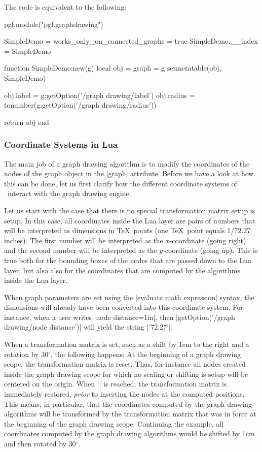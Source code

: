 The code is equivalent to the following:
\begin{codeexample}
pgf.module("pgf.graphdrawing")

SimpleDemo = { works_only_on_connected_graphs = true }
SimpleDemo.__index = SimpleDemo

function SimpleDemo:new(g)
  local obj = { graph = g }
  setmetatable(obj, SimpleDemo)
  
  obj.label  = g:getOption('/graph drawing/label')
  obj.radius = tonumber(g:getOption('/graph drawing/radius'))
  
  return obj  
end  
\end{codeexample}



\subsubsection{Coordinate Systems in Lua}

\label{section-gd-lua-coordinates}

The main job of a graph drawing algorithm is to modify the
coordinates of the nodes of the graph object in the |graph|
attribute. Before we have a look at how this can be done, let us 
first clarify how the different coordinate systems of \pgfname\
interact with the graph drawing engine.

Let us start with the case that there is no special transformation
matrix setup is setup. In this case, all coordinates inside the Lua
layer are pairs of numbers that will be interpreted as dimensions in
\TeX\ points (one \TeX\ point equals 1/72.27 inches). The first number
will be interpreted as the $x$-coordinate (going right) and the second
number will be interpreted as the $y$-coordinate (going up). This is
true both for the bounding boxes of the nodes that are passed down to
the Lua layer, but also also for the coordinates that are computed by
the algorithms inside the Lua layer.

When graph parameters are set using the |evaluate math expression|
syntax, the dimensions will already have been converted into this
coordinate system. For instance, when a user writes
|node distance=1in|, then |getOption('/graph drawing/node distance')|
will yield the string |'72.27'|.

When a transformation matrix is
set, such as a shift by 1cm to the right and a rotation by
30$^\circ$, the following happens: At the beginning of a
graph drawing scope, the transformation matrix is reset. Thus, for
instance all nodes created inside the graph drawing scope for which no
scaling or shifting is setup will be centered on the origin. When
|\pgfgdendscope| is reached, the transformation matrix is immediately
restored, \emph{prior} to inserting the nodes at the computed
positions. This means, in particular, that the coordinates computed by
the graph drawing algorithms will be transformed by the transformation
matrix that was in force at the beginning of the graph drawing
scope. Continuing the example, all coordinates computed by the graph
drawing algorithms would be shifted by 1cm and then rotated by
30$^\circ$.

